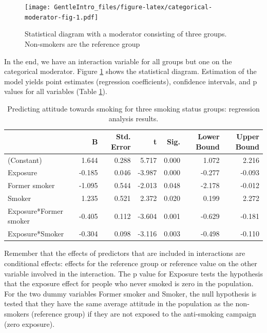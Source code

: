\documentclass[a4paper]{book}
\theoremstyle{definition}
\theoremstyle{definition}
\theoremstyle{definition}
\theoremstyle{remark}
\begin{document}
\begin{figure}[H]
\centering
\texttt{[image: GentleIntro\_files/figure-latex/categorical-moderator-fig-1.pdf]}
\caption{\label{fig:categorical-moderator-fig}Statistical diagram with a
moderator consisting of three groups. Non-smokers are the reference
group}
\end{figure}

In the end, we have an interaction variable for all groups but one on
the categorical moderator. Figure \ref{fig:categorical-moderator-fig}
shows the statistical diagram. Estimation of the model yields point
estimates (regression coefficients), confidence intervals, and p values
for all variables (Table \ref{tab:cat-moderator-results}).

\begin{table}

\caption{\label{tab:cat-moderator-results}Predicting attitude towards smoking for three smoking status groups: regression analysis results.}
\centering
\fontsize{8}{8}\selectfont
\begin{tabular}[t]{lrrrrrr}
\hline
  & B & Std. Error & t & Sig. & Lower Bound & Upper Bound\\
\hline
(Constant) & 1.644 & 0.288 & 5.717 & 0.000 & 1.072 & 2.216\\
Exposure & -0.185 & 0.046 & -3.987 & 0.000 & -0.277 & -0.093\\
Former smoker & -1.095 & 0.544 & -2.013 & 0.048 & -2.178 & -0.012\\
Smoker & 1.235 & 0.521 & 2.372 & 0.020 & 0.199 & 2.272\\
Exposure*Former smoker & -0.405 & 0.112 & -3.604 & 0.001 & -0.629 & -0.181\\
Exposure*Smoker & -0.304 & 0.098 & -3.116 & 0.003 & -0.498 & -0.110\\
\hline
\end{tabular}
\end{table}

Remember that the effects of predictors that are included in
interactions are conditional effects: effects for the reference group or
reference value on the other variable involved in the interaction. The p
value for Exposure tests the hypothesis that the exposure effect for
people who never smoked is zero in the population. For the two dummy
variables Former smoker and Smoker, the null hypothesis is tested that
they have the same average attitude in the population as the non-smokers
(reference group) if they are not exposed to the anti-smoking campaign
(zero exposure).
\end{document}
